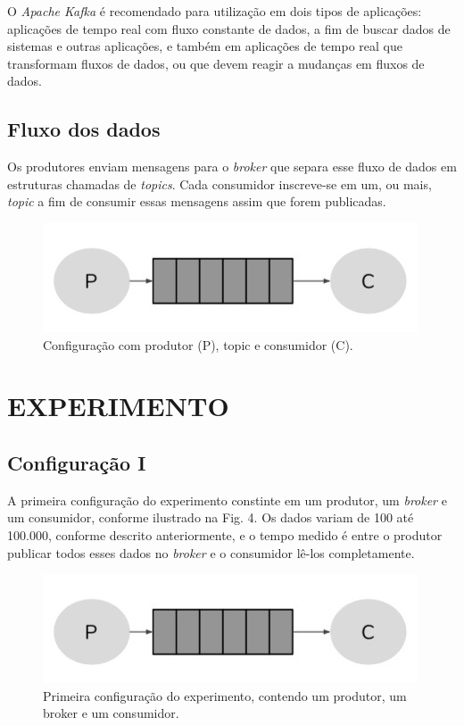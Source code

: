 \documentclass[letterpaper, 10 pt, conference]{ieeeconf}  %
\begin{document}
O \textit{Apache Kafka} é recomendado para utilização em dois tipos de aplicações: aplicações de tempo real com fluxo constante de dados, a fim de buscar dados de sistemas e outras aplicações, e também em aplicações de tempo real que transformam fluxos de dados, ou que devem reagir a mudanças em fluxos de dados.

\subsection{Fluxo dos dados}

Os produtores enviam mensagens para o \textit{broker} que separa esse fluxo de dados em estruturas chamadas de \textit{topics}. Cada consumidor inscreve-se em um, ou mais, \textit{topic} a fim de consumir essas mensagens assim que forem publicadas.

\begin{figure}[ht]
\centering
\includegraphics[width=.4\textwidth]{kafka.jpeg}
\caption{Configuração com produtor (P), topic e consumidor (C).}
\label{fig:twoqueues}
\end{figure}

\section{EXPERIMENTO}

\subsection{Configuração I}

A primeira configuração do experimento constinte em um produtor, um \textit{broker} e um consumidor, conforme ilustrado na Fig. 4. Os dados variam de 100 até 100.000, conforme descrito anteriormente, e o tempo medido é entre o produtor publicar todos esses dados no \textit{broker} e o consumidor lê-los completamente.

\begin{figure}[ht]
\centering
\includegraphics[width=.4\textwidth]{one-queue.jpeg}
\caption{Primeira configuração do experimento, contendo um produtor, um broker e um consumidor.}
\label{fig:onequeue}
\end{figure}
\end{document}
